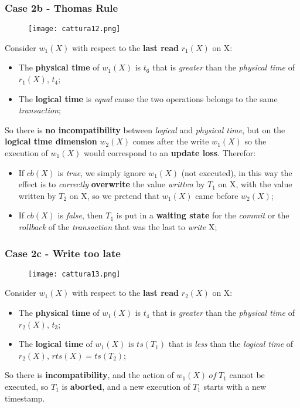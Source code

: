 \documentclass{article}
\begin{document}
\subsubsection {Case 2b - Thomas Rule}
\begin{figure}[H]
  \centering
  \texttt{[image: cattura12.png]}
\end{figure}
Consider $w_1(X)$ with respect to the \textbf{last read} $r_1(X)$ on X:
\begin{itemize}
\item The \textbf{physical time} of $w_1(X)$ is $t_6$ that is \emph{greater} than the \emph{physical time} of $r_1(X)$, $t_4$;
\item The \textbf{logical time} is \emph{equal} cause the two operations belongs to the same \emph{transaction};
\end{itemize}
So there is \textbf{no incompatibility} between \emph{logical} and \emph{physical time}, but on the \textbf{logical time dimension} $w_2(X)$ comes after the write $w_1(X)$ so the execution of $w_1(X)$ would correspond to an \textbf{update loss}. Therefor:
\begin{itemize}
\item If $cb(X)$ is \emph{true}, we simply ignore $w_1(X)$ (not executed), in this way the effect is to \emph{correctly} \textbf{overwrite} the value \emph{written} by $T_1$ on X, with the value written by $T_2$ on X, so we pretend that $w_1(X)$ came before $w_2(X)$;
\item If $cb(X)$ is \emph{false}, then $T_1$ is put in a \textbf{waiting state} for the \emph{commit} or the \emph{rollback} of the \emph{transaction} that was the last to \emph{write} X;
\end{itemize}
\subsubsection {Case 2c - Write too late}
\begin{figure}[H]
  \centering
  \texttt{[image: cattura13.png]}
\end{figure}
Consider $w_1(X)$ with respect to the \textbf{last read} $r_2(X)$ on X:
\begin{itemize}
\item The \textbf{physical time} of $w_1(X)$ is $t_4$ that is \emph{greater} than the \emph{physical time} of $r_2(X)$, $t_3$;
\item The \textbf{logical time} of $w_1(X)$ is $ts(T_1)$ that is \emph{less} than the \emph{logical time} of $r_2(X)$, $rts(X) = ts(T_2)$;
\end{itemize}
So there is \textbf{incompatibility}, and the action of $w_1(X)\ of\ T_1$ cannot be executed, so $T_1$ is \textbf{aborted}, and a new execution of $T_1$ starts with a new timestamp.
\end{document}
